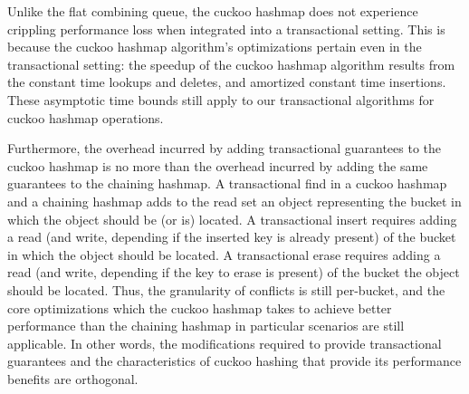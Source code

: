 Unlike the flat combining queue, the cuckoo hashmap does not experience crippling performance loss when integrated into a transactional setting. This is because the cuckoo hashmap algorithm's optimizations pertain even in the transactional setting: the speedup of the cuckoo hashmap algorithm results from the constant time lookups and deletes, and amortized constant time insertions. These asymptotic time bounds still apply to our transactional algorithms for cuckoo hashmap operations.

Furthermore, the overhead incurred by adding transactional guarantees to the cuckoo hashmap is no more than the overhead incurred by adding the same guarantees to the chaining hashmap. A transactional find in a cuckoo hashmap and a chaining hashmap adds to the read set an object representing the bucket in which the object should be (or is) located.  A transactional insert requires adding a read (and write, depending if the inserted key is already present) of the bucket in which the object should be located. A transactional erase requires adding a read (and write, depending if the key to erase is present) of the bucket the object should be located. Thus, the granularity of conflicts is still per-bucket, and the core optimizations which the cuckoo hashmap takes to achieve better performance than the chaining hashmap in particular scenarios are still applicable. In other words, the modifications required to provide transactional guarantees and the characteristics of cuckoo hashing that provide its performance benefits are orthogonal.
